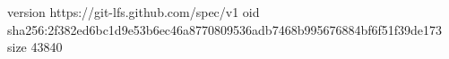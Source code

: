 version https://git-lfs.github.com/spec/v1
oid sha256:2f382ed6bc1d9e53b6ec46a8770809536adb7468b995676884bf6f51f39de173
size 43840
